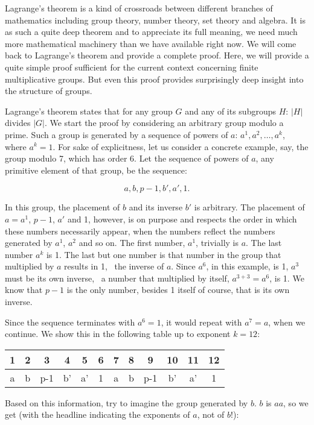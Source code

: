\documentclass{scrreprt}
\begin{document}
Lagrange's theorem is a kind of crossroads
between different branches of mathematics
including group theory, number theory,
set theory and algebra. 
It is as such a quite deep theorem and
to appreciate its full meaning,
we need much more mathematical machinery
than we have available right now.
We will come back to Lagrange's theorem
and provide a complete proof.
Here, we will provide a quite simple
proof sufficient for the current context
concerning finite multiplicative groups.
But even this proof provides surprisingly
deep insight into the structure of groups.

Lagrange's theorem states that for 
any group $G$ and any of its subgroups $H$:
$|H|$ divides $|G|$.
We start the proof by considering
an arbitrary group modulo a prime.
Such a group is generated by a sequence
of powers of $a$: $a^1, a^2, \dots, a^k$,
where $a^k = 1$.
For sake of explicitness, let us consider
a concrete example, say, the group modulo 7,
which has order 6.
Let the sequence of powers of $a$, any 
primitive element of that group, be the sequence:

\[
a,b,p-1,b',a',1.
\]

In this group, the placement of $b$ 
and its inverse $b'$ is arbitrary.
The placement of $a = a^1$, $p-1$, $a'$ and 1,
however, is on purpose and respects the order
in which these numbers necessarily appear,
when the numbers reflect the numbers generated
by $a^1$, $a^2$ and so on.
The first number, $a^1$, trivially is $a$.
The last number $a^k$ is 1.
The last but one number is that number in the group
that multiplied by $a$ results in 1, 
\ie\ the inverse of $a$. 
Since $a^6$, in this example, is 1, 
$a^3$ must be its own inverse, 
\ie\ a number that multiplied by itself, 
$a^{3+3}=a^6$, is 1. 
We know that $p-1$ is the only number,
besides 1 itself of course, that is its own inverse.

Since the sequence terminates with $a^6 = 1$,
it would repeat with $a^7=a$, when we continue.
We show this in the following table up to exponent $k=12$:

\begin{center}
\begin{tabular}{|c|c|c|c|c|c|c|c|c|c|c|c}
 1 &  2 &  3 &  4 &  5 &  6 &  7 &  8 &  9 & 10 & 11 & 12 \\\hline
 a &  b & p-1& b' & a' &  1 &  a &  b &p-1 & b' & a' & 1 
\end{tabular}
\end{center}

Based on this information, try to imagine the group
generated by $b$. $b$ is $aa$, so we get (with the headline
indicating the exponents of $a$, not of $b$!):
\end{document}
